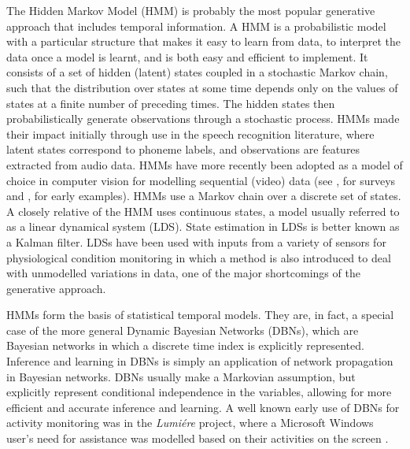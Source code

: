 The Hidden Markov Model (HMM) is probably the most popular generative approach that includes temporal information. A HMM is a probabilistic model with a particular structure that makes it easy to learn from data, to interpret the data once a model is learnt, and is both easy and efficient to implement. It consists of a set of hidden (latent) states coupled in a stochastic Markov chain, such that the distribution over states at some time depends only on the values of states at a finite number of preceding times. The hidden states then probabilistically generate observations through a stochastic process. HMMs made their impact initially through use in the speech recognition literature, where latent states correspond to phoneme labels, and observations are features extracted from audio data. HMMs have more recently been adopted as a model of choice in computer vision for modelling sequential (video) data (see \cite{Gavrila1999}, \cite{Moeslund2006} for surveys and \cite{Galata1999}, \cite{Starner1995} for early examples). HMMs use a Markov chain over a discrete set of states. A closely relative of the HMM uses continuous states, a model usually referred to as a linear dynamical system (LDS). State estimation in LDSs is better known as a Kalman filter. LDSs have been used with inputs from a variety of sensors for physiological condition monitoring \cite{Quinn2009} in which a method is also introduced to deal with unmodelled variations in data, one of the major shortcomings of the generative approach.

HMMs form the basis of statistical temporal models. They are, in fact, a special case of the more general Dynamic Bayesian Networks (DBNs), which are Bayesian networks in which a discrete time index is explicitly represented. Inference and learning in DBNs is simply an application of network propagation in Bayesian networks. DBNs usually make a Markovian assumption, but explicitly represent conditional independence in the variables, allowing for more efficient and accurate inference and learning. A well known early use of DBNs for activity monitoring was in the \textit{Lumi\'ere} project, where a Microsoft Windows user’s need for assistance was modelled based on their activities on the screen \cite{Horvitz1998}.

